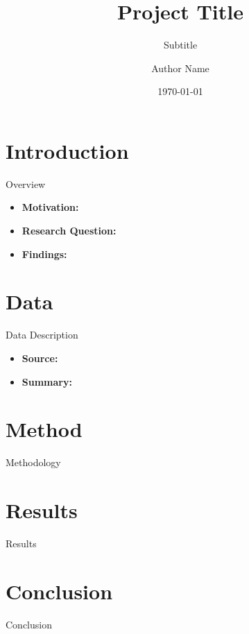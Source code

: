 \documentclass{beamer}
\title{Project Title}
\subtitle{Subtitle}
\institute{ECON1680}
\author{{Author Name}}
\date{\today}
\begin{document}
\begin{frame}
    \titlepage
\end{frame}

\section{Introduction}
\begin{frame}{Overview} 
    \begin{itemize}
        \item \textbf{Motivation:}
        \item \textbf{Research Question:}
        \item \textbf{Findings:}
    \end{itemize}
\end{frame}

\section{Data}

\begin{frame}{Data Description}
\begin{itemize}
    \item \textbf{Source:}
    \item \textbf{Summary:}
\end{itemize}
\end{frame}


\section{Method}

\begin{frame}{Methodology}
	
\end{frame}

\section{Results}

\begin{frame}{Results}
	
\end{frame}

\section{Conclusion}

\begin{frame}{Conclusion}
	
\end{frame}
\end{document}

